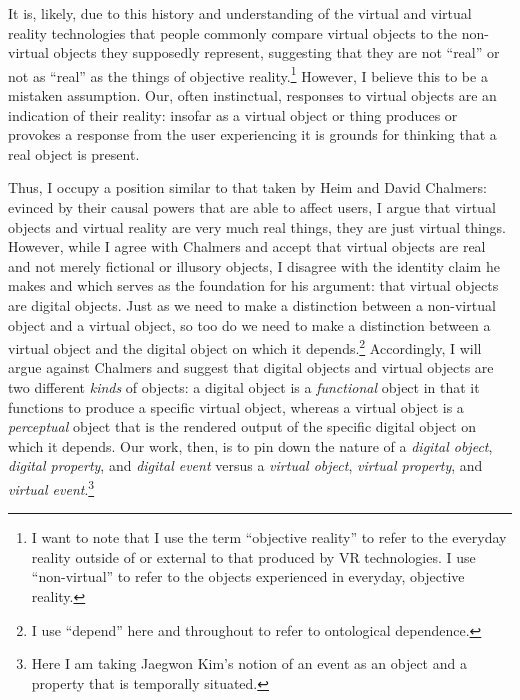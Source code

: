\documentclass{article}
\begin{document}
It is, likely, due to this history and understanding of the virtual and virtual reality technologies that people commonly compare virtual objects to the non-virtual objects they supposedly represent, suggesting that they are not ``real'' or not as ``real'' as the things of objective reality.\footnote{I want to note that I use the term ``objective reality'' to refer to the everyday reality outside of or external to that produced by VR technologies. I use ``non-virtual'' to refer to the objects experienced in everyday, objective reality.} However, I believe this to be a mistaken assumption. Our, often instinctual, responses to virtual objects are an indication of their reality: insofar as a virtual object or thing produces or provokes a response from the user experiencing it is grounds for thinking that a real object is present.

Thus, I occupy a position similar to that taken by Heim and David Chalmers: evinced by their causal powers that are able to affect users, I argue that virtual objects and virtual reality are very much real things, they are just virtual things. However, while I agree with Chalmers and accept that virtual objects are real and not merely fictional or illusory objects, I disagree with the identity claim he makes and which serves as the foundation for his argument: that virtual objects are digital objects. Just as we need to make a distinction between a non-virtual object and a virtual object, so too do we need to make a distinction between a virtual object and the digital object on which it depends.\footnote{I use ``depend'' here and throughout to refer to ontological dependence.} Accordingly, I will argue against Chalmers and suggest that digital objects and virtual objects are two different \textit{kinds} of objects: a digital object is a \textit{functional} object in that it functions to produce a specific virtual object, whereas a virtual object is a \textit{perceptual} object that is the rendered output of the specific digital object on which it depends. Our work, then, is to pin down the nature of a \textit{digital object}, \textit{digital property}, and \textit{digital event} versus a \textit{virtual object}, \textit{virtual property}, and \textit{virtual event}.\footnote{Here I am taking Jaegwon Kim’s notion of an event as an object and a property that is temporally situated.}
\end{document}
